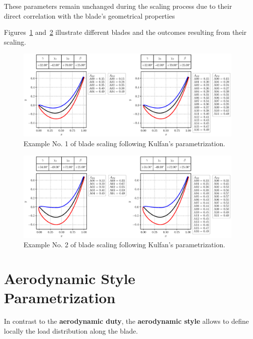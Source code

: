 These parameters remain unchanged during the scaling process due to their direct correlation with the blade's geometrical properties

Figures~\ref{fig:blade01} and~\ref{fig:blade03} illustrate different blades and the outcomes resulting from their scaling.

\begin{figure}[H]
  \centering
  \hspace*{-3cm}
  \includegraphics[width=1.35\textwidth]{pyFigure/figures/blade1.eps}
  \caption{Example No. 1 of blade scaling following Kulfan's parametrization.}
  \label{fig:blade01}
\end{figure}

\begin{figure}[H]
  \centering
  \hspace*{-3cm}
  \includegraphics[width=1.35\textwidth]{pyFigure/figures/blade2.eps}
  \caption{Example No. 2 of blade scaling following Kulfan's parametrization.}
  \label{fig:blade03}
\end{figure}

\section{Aerodynamic Style Parametrization}
\label{sec:aeroStyle}

In contrast to the \textbf{aerodynamic duty}, the \textbf{aerodynamic style} allows to define locally the load distribution along the blade. 


